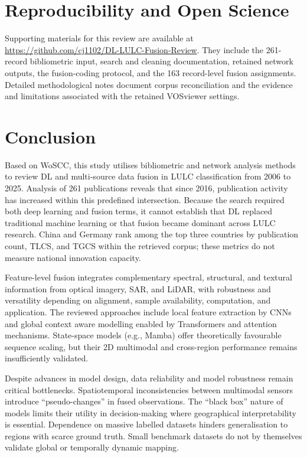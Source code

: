 \documentclass[]{interact}
\theoremstyle{plain}%
\theoremstyle{definition}
\theoremstyle{remark}
\begin{document}
\section{Reproducibility and Open Science}

Supporting materials for this review are available at \url{https://github.com/cj1102/DL-LULC-Fusion-Review}. They include the 261-record bibliometric input, search and cleaning documentation, retained network outputs, the fusion-coding protocol, and the 163 record-level fusion assignments. Detailed methodological notes document corpus reconciliation and the evidence and limitations associated with the retained VOSviewer settings.

\section{Conclusion}
Based on WoSCC, this study utilises bibliometric and network analysis methods to review DL and multi-source data fusion in LULC classification from 2006 to 2025. Analysis of 261 publications reveals that since 2016, publication activity has increased within this predefined intersection. Because the search required both deep learning and fusion terms, it cannot establish that DL replaced traditional machine learning or that fusion became dominant across LULC research. China and Germany rank among the top three countries by publication count, TLCS, and TGCS within the retrieved corpus; these metrics do not measure national innovation capacity.

Feature-level fusion integrates complementary spectral, structural, and textural information from optical imagery, SAR, and LiDAR, with robustness and versatility depending on alignment, sample availability, computation, and application. The reviewed approaches include local feature extraction by CNNs and global context aware modelling enabled by Transformers and attention mechanisms. State-space models (e.g., Mamba) offer theoretically favourable sequence scaling, but their 2D multimodal and cross-region performance remains insufficiently validated.

Despite advances in model design, data reliability and model robustness remain critical bottlenecks. Spatiotemporal inconsistencies between multimodal sensors introduce ``pseudo-changes'' in fused observations. The ``black box'' nature of models limits their utility in decision-making where geographical interpretability is essential. Dependence on massive labelled datasets hinders generalisation to regions with scarce ground truth. Small benchmark datasets do not by themselves validate global or temporally dynamic mapping.
\end{document}
